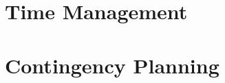 \section{Time Management} %
\label{sec:time_management}



\section{Contingency Planning} %
\label{sec:contingency_planning}


